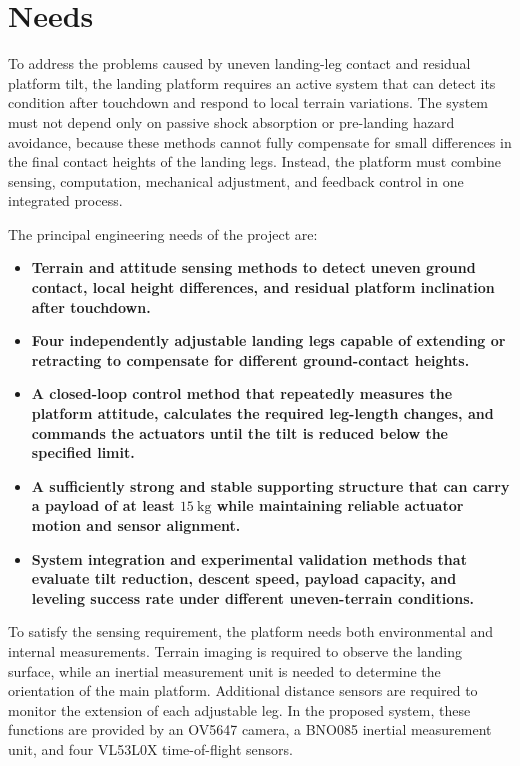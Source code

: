 \documentclass{engr1000j-s2}
\begin{document}
\section{Needs}
\label{sec:needs}

To address the problems caused by uneven landing-leg contact and residual platform tilt, the landing platform requires an active system that can detect its condition after touchdown and respond to local terrain variations. The system must not depend only on passive shock absorption or pre-landing hazard avoidance, because these methods cannot fully compensate for small differences in the final contact heights of the landing legs. Instead, the platform must combine sensing, computation, mechanical adjustment, and feedback control in one integrated process.

The principal engineering needs of the project are:

\begin{itemize}
    \item \textbf{Terrain and attitude sensing methods to detect uneven ground contact, local height differences, and residual platform inclination after touchdown.}

    \item \textbf{Four independently adjustable landing legs capable of extending or retracting to compensate for different ground-contact heights.}

    \item \textbf{A closed-loop control method that repeatedly measures the platform attitude, calculates the required leg-length changes, and commands the actuators until the tilt is reduced below the specified limit.}

    \item \textbf{A sufficiently strong and stable supporting structure that can carry a payload of at least \(15~\mathrm{kg}\) while maintaining reliable actuator motion and sensor alignment.}

    \item \textbf{System integration and experimental validation methods that evaluate tilt reduction, descent speed, payload capacity, and leveling success rate under different uneven-terrain conditions.}
\end{itemize}

To satisfy the sensing requirement, the platform needs both environmental and internal measurements. Terrain imaging is required to observe the landing surface, while an inertial measurement unit is needed to determine the orientation of the main platform. Additional distance sensors are required to monitor the extension of each adjustable leg. In the proposed system, these functions are provided by an OV5647 camera, a BNO085 inertial measurement unit, and four VL53L0X time-of-flight sensors.
\end{document}
